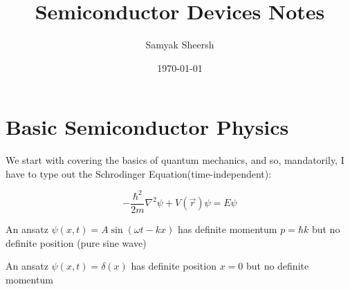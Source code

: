 \documentclass[12pt]{article}
\author{Samyak Sheersh}
\date{\today}
\title{Semiconductor Devices Notes}
\begin{document}
\maketitle
\tableofcontents

\section{Basic Semiconductor Physics}
We start with covering the basics of quantum mechanics, and so, mandatorily, I have to type out the Schrodinger Equation(time-independent):

\begin{equation}
    -\frac{\hbar^2}{2m}\nabla^2 \psi +V(\vec{r})\psi = E\psi
\end{equation}

An ansatz $\psi(x,t)=A \sin(\omega t- k x)$ has definite momentum $p=\hbar k$ but no definite position (pure sine wave)

An ansatz $\psi(x,t)=\delta(x)$ has definite position $x=0$ but no definite momentum
\end{document}
